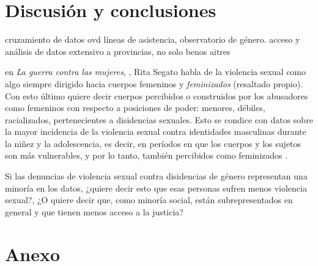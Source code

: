 \documentclass[10 pt]{article}
\begin{document}
\section*{Discusión y conclusiones}\label{conc}
cruzamiento de datos ovd líneas de asistencia, observatorio de género.
acceso y análisis de datos extensivo a provincias, no solo benos aitres


en \textit{La guerra contra las mujeres}, \citeyearpar{segato2016guerra}, Rita Segato habla de la violencia sexual como algo siempre dirigido hacia cuerpos femeninos y \textit{feminizados} (resaltado propio). Con esto último quiere decir cuerpos percibidos o construidos por los abusadores como femeninos con respecto a posiciones de poder: menores, débiles, racializados, pertenecientes a disidencias sexuales. Esto se condice con datos sobre la mayor incidencia de la violencia sexual contra identidades masculinas durante la niñez y la adolescencia, es decir, en períodos en que los cuerpos y los sujetos son más vulnerables, y por lo tanto, también percibidos como feminizados \citep*{contreras2016violencia,ufem_relevamiento,ferris2002world}.

Si las denuncias de violencia sexual contra disidencias de género representan una minoría en los datos, ¿quiere decir esto que esas personas sufren menos violencia sexual?, ¿O quiere decir que, como minoría social, están subrepresentados en general y que tienen menos acceso a la justicia?

\newpage




\newpage
\section*{Anexo}\label{anex}
\end{document}
